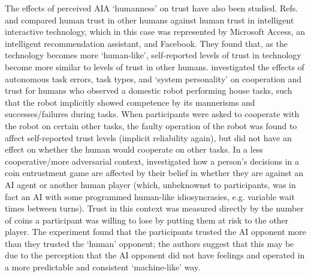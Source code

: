 The effects of perceived AIA `humanness' on trust have also been studied. 
Refs. \cite{Lankton2008-ct} and \cite{Tripp2011-rx} compared human trust in other humans against human trust in intelligent interactive technology, which in this case was represented by Microsoft Access, an intelligent recommendation assistant, and Facebook. 
They found that, as the technology becomes more `human-like', self-reported levels of trust in technology become more similar to levels of trust in other humans. 
\citet{Salem2015-md} investigated the effects of autonomous task errors, task types, and `system personality' on cooperation and trust for humans who observed a domestic robot performing house tasks, such that the robot implicitly showed competence by its mannerisms and successes/failures during tasks. When participants were asked to cooperate with the robot on certain other tasks, the faulty operation of the robot was found to affect self-reported trust levels (implicit reliability again), but did not have an effect on whether the human would cooperate on other tasks. %
In a less cooperative/more adversarial context, \citet{Wu2016-ei} investigated how a person's decisions in a coin entrustment game are affected by their belief in whether they are against an AI agent or another human player (which, unbeknownst to participants, was in fact an AI with some programmed human-like idiosyncrasies, e.g. variable wait times between turns). 
Trust in this context was measured directly by the number of coins a participant was willing to lose by putting them at risk to the other player. The experiment found that the participants trusted the AI opponent more than they trusted the `human' opponent; the authors suggest that this may be due to the perception that the AI opponent did not have feelings and operated in a more predictable and consistent `machine-like' way. 

